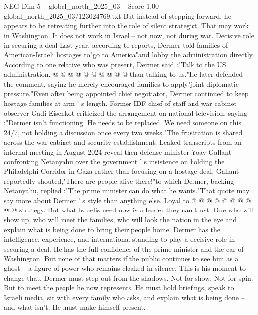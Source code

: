 \begin{textsample}{NEG Dim 5 – global\_north\_2025\_03 – Score 1.00 – global\_north\_2025\_03/123024769.txt}
But instead of stepping forward, he appears to be retreating further into the role of silent strategist.
That may work in Washington.
It does not work in Israel -- not now, not during war.
Decisive role in securing a deal Last year, according to reports, Dermer told families of American-Israeli hostages to"go to America"and lobby the administration directly.
According to one relative who was present, Dermer said :"Talk to the US administration. @ @ @ @ @ @ @ @ @ @ than talking to us."He later defended the comment, saying he merely encouraged families to apply"joint diplomatic pressure."Even after being appointed chief negotiator, Dermer continued to keep hostage families at arm ' s length.
Former IDF chief of staff and war cabinet observer Gadi Eisenkot criticized the arrangement on national television, saying :"Dermer isn't functioning.
He needs to be replaced.
We need someone on this 24/7, not holding a discussion once every two weeks."The frustration is shared across the war cabinet and security establishment.
Leaked transcripts from an internal meeting in August 2024 reveal then-defense minister Yoav Gallant confronting Netanyahu over the government ' s insistence on holding the Philadelphi Corridor in Gaza rather than focusing on a hostage deal.
Gallant reportedly shouted,"There are people alive there!"to which Dermer, backing Netanyahu, replied :"The prime minister can do what he wants."That quote may say more about Dermer ' s style than anything else.
Loyal to @ @ @ @ @ @ @ @ @ @ strategy.
But what Israelis need now is a leader they can trust.
One who will show up, who will meet the families, who will look the nation in the eye and explain what is being done to bring their people home.
Dermer has the intelligence, experience, and international standing to play a decisive role in securing a deal.
He has the full confidence of the prime minister and the ear of Washington.
But none of that matters if the public continues to see him as a ghost -- a figure of power who remains cloaked in silence.
This is his moment to change that.
Dermer must step out from the shadows.
Not for show.
Not for spin.
But to meet the people he now represents.
He must hold briefings, speak to Israeli media, sit with every family who asks, and explain what is being done -- and what isn't.
He must make himself present.

\end{textsample}
